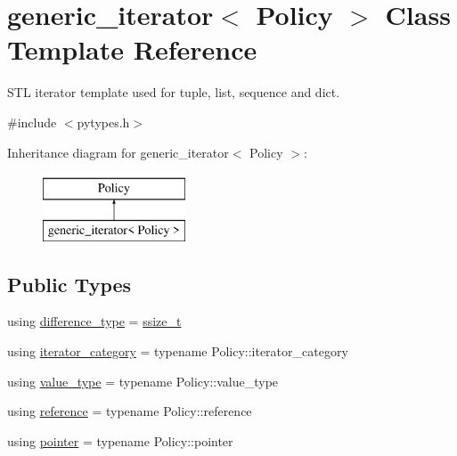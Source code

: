 \hypertarget{classgeneric__iterator}{}\section{generic\+\_\+iterator$<$ Policy $>$ Class Template Reference}
\label{classgeneric__iterator}


S\+TL iterator template used for tuple, list, sequence and dict.  




{\ttfamily \#include $<$pytypes.\+h$>$}

Inheritance diagram for generic\+\_\+iterator$<$ Policy $>$\+:\begin{figure}[H]
\begin{center}
\leavevmode
\includegraphics[height=2.000000cm]{classgeneric__iterator}
\end{center}
\end{figure}
\subsection*{Public Types}
\begin{DoxyCompactItemize}
\item 
using \mbox{\hyperlink{classgeneric__iterator_a307cd6eddc16127eb873d76bcfc07233}{difference\+\_\+type}} = \mbox{\hyperlink{detail_2common_8h_ac430d16fc097b3bf0a7469cfd09decda}{ssize\+\_\+t}}
\item 
using \mbox{\hyperlink{classgeneric__iterator_a49d278e5bd704d850843005e61b62883}{iterator\+\_\+category}} = typename Policy\+::iterator\+\_\+category
\item 
using \mbox{\hyperlink{classgeneric__iterator_ae0024f1a05a39cbf0a2bc6f07b4357e0}{value\+\_\+type}} = typename Policy\+::value\+\_\+type
\item 
using \mbox{\hyperlink{classgeneric__iterator_aed22b28672b10453f89e239e55277808}{reference}} = typename Policy\+::reference
\item 
using \mbox{\hyperlink{classgeneric__iterator_ab1e9fe365dec39e05180fb7e1c153f2e}{pointer}} = typename Policy\+::pointer
\end{DoxyCompactItemize}
